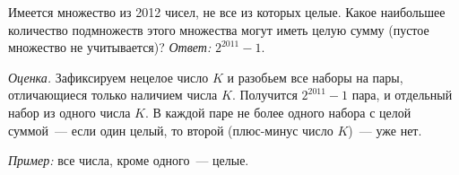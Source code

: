 \problem
Имеется множество из 2012 чисел, не все из которых целые.
Какое наибольшее количество подмножеств этого множества могут иметь целую
сумму (пустое множество не учитывается)?
\solution
\emph{Ответ:} $2^{2011} - 1$.
\par
\emph{Оценка.}
Зафиксируем нецелое число $K$ и разобьем все наборы на пары, отличающиеся
только наличием числа $K$.
Получится $2^{2011} - 1$ пара, и отдельный набор из одного числа $K$.
В каждой паре не более одного набора с целой суммой~--- если один целый,
то второй (плюс-минус число $K$)~--- уже нет.
\par
\emph{Пример:} все числа, кроме одного~--- целые.
\endproblem
